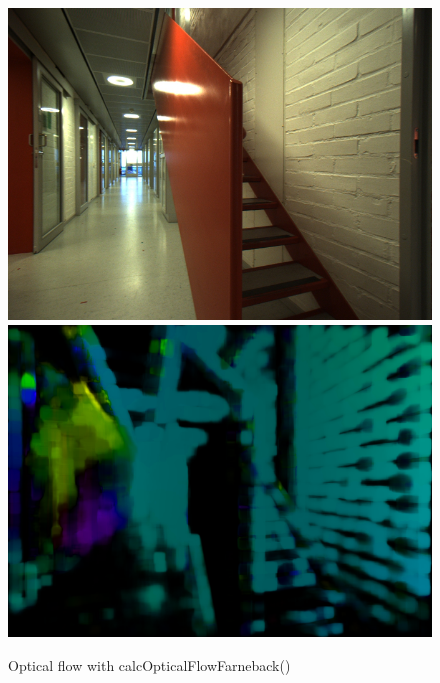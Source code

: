 \documentclass{article}
\begin{document}
\begin{figure}
\center
            \includegraphics[width=1\textwidth]{opticalfb}
            \includegraphics[width=1\textwidth]{opticalhsv}
\caption{Optical flow with calcOpticalFlowFarneback() }
\end{figure}       
\newpage
\end{document}
